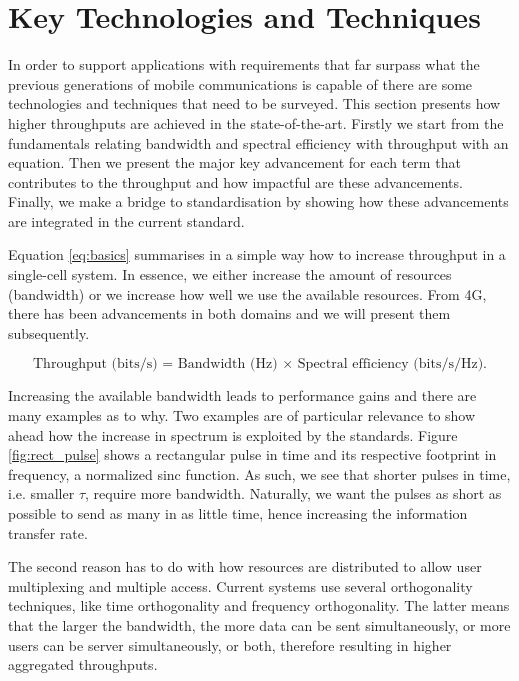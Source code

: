 \section{Key Technologies and Techniques}
\label{sec:key_tech}

In order to support applications with requirements that far surpass what the previous generations of mobile communications is capable of there are some technologies and techniques that need to be surveyed. This section presents how higher throughputs are achieved in the state-of-the-art. Firstly we start from the fundamentals relating bandwidth and spectral efficiency with throughput with an equation. Then we present the major key advancement for each term that contributes to the throughput and how impactful are these advancements. Finally, we make a bridge to standardisation by showing how these advancements are integrated in the current standard.

Equation \eqref{eq:basics} summarises in a simple way how to increase throughput in a single-cell system. In essence, we either increase the amount of resources (bandwidth) or we increase how well we use the available resources. From \ac{4G}, there has been advancements in both domains and we will present them subsequently.

\begin{equation} \label{eq:basics}
    \text{Throughput (bits/s) = Bandwidth (Hz) $\times$ Spectral efficiency (bits/s/Hz).}    
\end{equation}


Increasing the available bandwidth leads to performance gains and there are many examples as to why. Two examples are of particular relevance to show ahead how the increase in spectrum is exploited by the standards. Figure \ref{fig:rect_pulse} shows a rectangular pulse in time and its respective footprint in frequency, a 
normalized sinc function. As such, we see that shorter pulses in time, i.e. smaller $\tau$, require more bandwidth. Naturally, we want the pulses as short as possible to send as many in as little time, hence increasing the information transfer rate.



The second reason has to do with how resources are distributed to allow user multiplexing and multiple access. Current systems use several orthogonality techniques, like time orthogonality and frequency orthogonality. The latter means that the larger the bandwidth, the more data can be sent simultaneously, or more users can be server simultaneously, or both, therefore resulting in higher aggregated throughputs.


